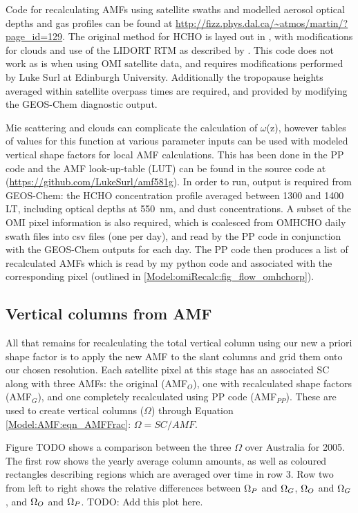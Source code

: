     Code for recalculating AMFs using satellite swaths and modelled aerosol optical depths and gas profiles can be found at \url{http://fizz.phys.dal.ca/~atmos/martin/?page_id=129}. 
    The original method for HCHO is layed out in \textcite{Palmer2001}, with modifications for clouds and use of the LIDORT RTM \parencite{Spurr2002} as described by \textcite{Martin2003}.
    This code does not work as is when using OMI satellite data, and requires modifications performed by Luke Surl at Edinburgh University.
    Additionally the tropopause heights averaged within satellite overpass times are required, and provided by modifying the GEOS-Chem diagnostic output.
    
    Mie scattering and clouds can complicate the calculation of $\omega$(z), however tables of values for this function at various parameter inputs can be used with modeled vertical shape factors for local AMF calculations.
    This has been done in the PP code and the AMF look-up-table (LUT) can be found in the source code at (\url{https://github.com/LukeSurl/amf581g}).
    In order to run, output is required from GEOS-Chem: the HCHO concentration profile averaged between 1300 and 1400 LT, including optical depths at 550~nm, and dust concentrations.
    A subset of the OMI pixel information is also required, which is coalesced from OMHCHO daily swath files into csv files (one per day), and read by the PP code in conjunction with the GEOS-Chem outputs for each day.
    The PP code then produces a list of recalculated AMFs which is read by my python code and associated with the corresponding pixel (outlined in \ref{Model:omiRecalc:fig_flow_omhchorp}).
    
    
  \subsection{Vertical columns from AMF}
    
    All that remains for recalculating the total vertical column using our new a priori shape factor is to apply the new AMF to the slant columns and grid them onto our chosen resolution.
    Each satellite pixel at this stage has an associated SC along with three AMFs: the original (AMF$_O$), one with recalculated shape factors (AMF$_G$), and one completely recalculated using PP code (AMF$_{PP}$).
    These are used to create vertical columns ($\Omega$) through Equation \ref{Model:AMF:eqn_AMFFrac}: $\Omega = SC/AMF$.
    
    Figure TODO shows a comparison between the three $\Omega$ over Australia for 2005. 
    The first row shows the yearly average column amounts, as well as coloured rectangles describing regions which are averaged over time in row 3.
    Row two from left to right shows the relative differences between $\Omega_{P}$ and $\Omega_{G}$, $\Omega_{O}$ and $\Omega_{G}$, and $\Omega_{O}$ and $\Omega_{P}$.
    TODO: Add this plot here.
    
